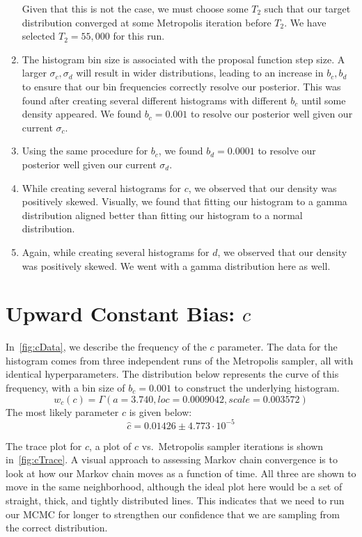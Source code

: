\begin{enumerate}
        Given that this is not the case, we must choose some $T_2$ such that our target distribution converged
        at some Metropolis iteration before $T_2$.
        We have selected $T_2 = 55,000$ for this run.
    \item The histogram bin size is associated with the proposal function step size.
        A larger $\sigma_c, \sigma_d$ will result in wider distributions, leading to an increase in $b_c, b_d$ to
        ensure that our bin frequencies correctly resolve our posterior.
        This was found after creating several different histograms with different $b_c$ until some density appeared.
        We found $b_c = 0.001$ to resolve our posterior well given our current $\sigma_c$.
    \item Using the same procedure for $b_c$, we found $b_d = 0.0001$ to resolve our posterior well given our
        current $\sigma_d$.
    \item While creating several histograms for $c$, we observed that our density was positively skewed.
        Visually, we found that fitting our histogram to a gamma distribution aligned better than fitting our histogram
        to a normal distribution.
    \item Again, while creating several histograms for $d$, we observed that our density was positively skewed.
        We went with a gamma distribution here as well.
\end{enumerate}

\section{Upward Constant Bias: $c$}\label{sec:upwardConstantBias}
In~\autoref{fig:cData}, we describe the frequency of the $c$ parameter.
The data for the histogram comes from three independent runs of the Metropolis sampler, all with identical
hyperparameters.
The distribution below represents the curve of this frequency, with a bin size of $b_c = 0.001$ to construct the
underlying histogram.
\begin{equation}
    w_c(c) = \Gamma(a = 3.740, \mathit{loc} = 0.0009042, \mathit{scale} = 0.003572)
\end{equation}
The most likely parameter $\hat{c}$ is given below:
\begin{equation}
    \hat{c} = 0.01426 \pm 4.773 \cdot 10^{-5}
\end{equation}

The trace plot for $c$, a plot of $c$ vs.\ Metropolis sampler iterations is shown in~\autoref{fig:cTrace}.
A visual approach to assessing Markov chain convergence is to look at how our Markov chain moves as a function of
time.
All three are shown to move in the same neighborhood, although the ideal plot here would be a set of straight, thick,
and tightly distributed lines.
This indicates that we need to run our MCMC for longer to strengthen our confidence that we are sampling from the
correct distribution.

